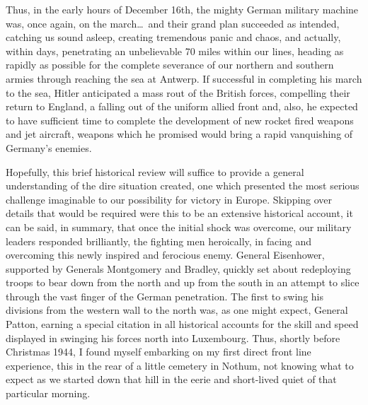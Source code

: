\documentclass[../m3y]{subfiles}
\begin{document}
Thus, in the early hours of December 16th, the mighty German military machine was, once again, on the march\ldots\ and their grand plan succeeded as intended, catching us sound asleep, creating tremendous panic and chaos, and actually, within days, penetrating an unbelievable 70 miles within our lines, heading as rapidly as possible for the complete severance of our northern and southern armies through reaching the sea at Antwerp. If successful in completing his march to the sea, Hitler anticipated a mass rout of the British forces, compelling their return to England, a falling out of the uniform allied front and, also, he expected to have sufficient time to complete the development of new rocket fired weapons and jet aircraft, weapons which he promised would bring a rapid vanquishing of Germany's enemies.

Hopefully, this brief historical review will suffice to provide a general understanding of the dire situation created, one which presented the most serious challenge imaginable to our possibility for victory in Europe. Skipping over details that would be required were this to be an extensive historical account, it can be said, in summary, that once the initial shock was overcome, our military leaders responded brilliantly, the fighting men heroically, in facing and overcoming this newly inspired and ferocious enemy. General Eisenhower, supported by Generals Montgomery and Bradley, quickly set about redeploying troops to bear down from the north and up from the south in an attempt to slice through the vast finger of the German penetration. The first to swing his divisions from the western wall to the north was, as one might expect, General Patton, earning a special citation in all historical accounts for the skill and speed displayed in swinging his forces north into Luxembourg. Thus, shortly before Christmas 1944, I found myself embarking on my first direct front line experience, this in the rear of a little cemetery in Nothum,  not knowing what to expect as we started down that hill in the eerie and short-lived quiet of that particular morning.
\end{document}
